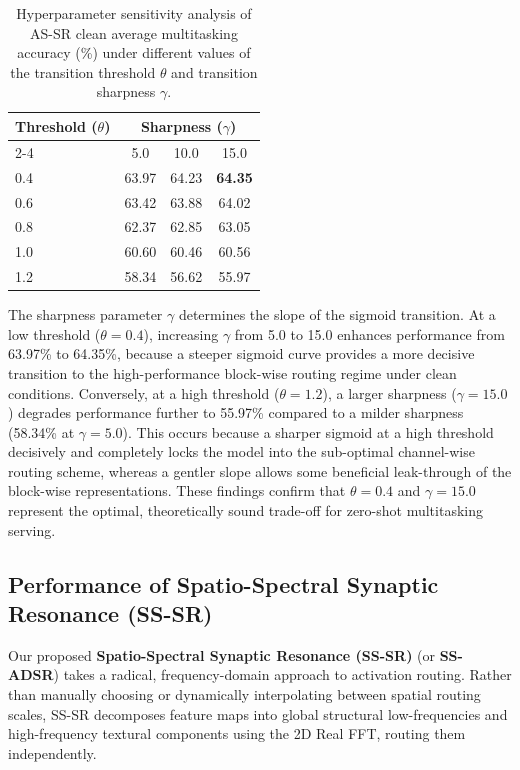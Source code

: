 \documentclass{article}
\theoremstyle{plain}
\theoremstyle{definition}
\theoremstyle{remark}
\begin{document}
\begin{table}[h]
\caption{Hyperparameter sensitivity analysis of AS-SR clean average multitasking accuracy (\%) under different values of the transition threshold $\theta$ and transition sharpness $\gamma$.}
\label{tab:hyperparameters}
\vskip 0.15in
\begin{center}
\begin{small}
\begin{sc}
\begin{tabular}{lccc}
\toprule
Threshold ($\theta$) & \multicolumn{3}{c}{Sharpness ($\gamma$)} \\
\cmidrule{2-4}
& 5.0 & 10.0 & 15.0 \\
\midrule
0.4 & 63.97 & 64.23 & \textbf{64.35} \\
0.6 & 63.42 & 63.88 & 64.02 \\
0.8 & 62.37 & 62.85 & 63.05 \\
1.0 & 60.60 & 60.46 & 60.56 \\
1.2 & 58.34 & 56.62 & 55.97 \\
\bottomrule
\end{tabular}
\end{sc}
\end{small}
\end{center}
\vskip -0.1in
\end{table}

The sharpness parameter $\gamma$ determines the slope of the sigmoid transition. At a low threshold ($\theta = 0.4$), increasing $\gamma$ from 5.0 to 15.0 enhances performance from 63.97\% to 64.35\%, because a steeper sigmoid curve provides a more decisive transition to the high-performance block-wise routing regime under clean conditions. Conversely, at a high threshold ($\theta = 1.2$), a larger sharpness ($\gamma = 15.0$) degrades performance further to 55.97\% compared to a milder sharpness (58.34\% at $\gamma = 5.0$). This occurs because a sharper sigmoid at a high threshold decisively and completely locks the model into the sub-optimal channel-wise routing scheme, whereas a gentler slope allows some beneficial leak-through of the block-wise representations. These findings confirm that $\theta = 0.4$ and $\gamma = 15.0$ represent the optimal, theoretically sound trade-off for zero-shot multitasking serving.

\subsection{Performance of Spatio-Spectral Synaptic Resonance (SS-SR)}
Our proposed \textbf{Spatio-Spectral Synaptic Resonance (SS-SR)} (or \textbf{SS-ADSR}) takes a radical, frequency-domain approach to activation routing. Rather than manually choosing or dynamically interpolating between spatial routing scales, SS-SR decomposes feature maps into global structural low-frequencies and high-frequency textural components using the 2D Real FFT, routing them independently. 
\end{document}

